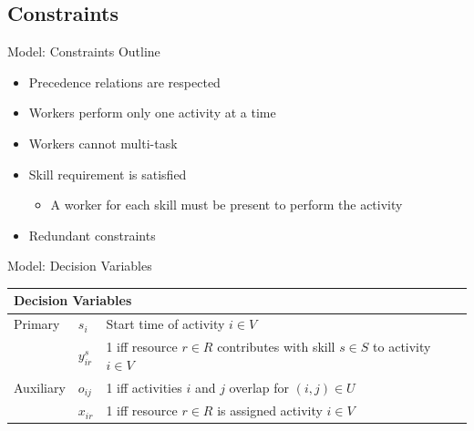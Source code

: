 \documentclass{beamer}
\begin{document}
\subsection{Constraints}
\begin{frame}{Model: Constraints Outline}
	\begin{itemize}
		\item \pause Precedence relations are respected\pause
		\vspace{2mm}
		\item Workers perform only one activity at a time\pause
		\vspace{2mm}
		\item Workers cannot multi-task\pause
		\vspace{2mm}
		\item Skill requirement is satisfied
		\begin{itemize}
			\item A worker for each skill must be present to perform the activity\pause
		\end{itemize}
		\vspace{2mm}
		\item Redundant constraints
	\end{itemize}
\end{frame}

\begin{frame}{Model: Decision Variables}
	\begin{adjustwidth}{-.9in}{-.9in}
	\begin{table}[h]
		\centering
		\vspace{1mm}
		\begin{tabular}{llp{8cm}}
			\toprule
			\multicolumn{3}{l}{ \bf{Decision Variables}}  \\
			\midrule
			Primary & $s_i$ & Start time of activity $i \in V$ \\
			 & $y_{ir}^s$ & 1 iff resource $r \in R$ contributes with skill $s \in S$ to activity $i \in V$\\\midrule
			Auxiliary & $o_{ij}$ & 1 iff activities $i$ and $j$ overlap for $(i,j)\in U$ \\
			 & $x_{ir}$ & 1 iff resource $r \in R$ is assigned activity $i \in V$ \\
			\bottomrule
		\end{tabular}
		\label{tab:vars}
	\end{table}
	\end{adjustwidth}
\end{frame}
\end{document}
